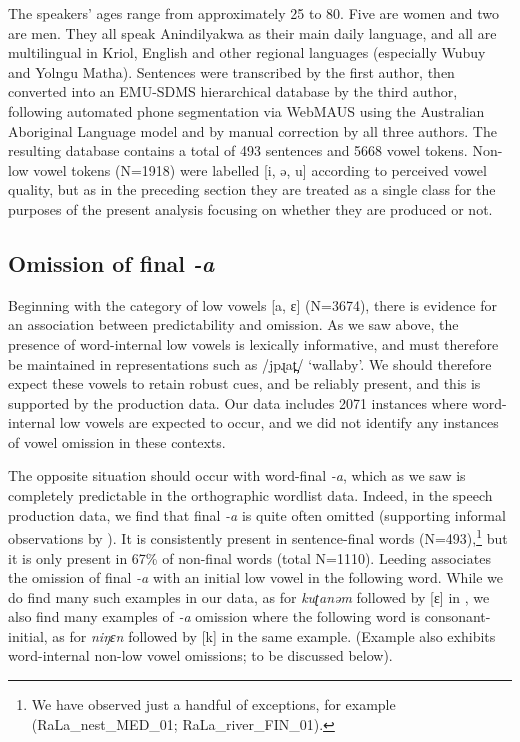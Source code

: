 \documentclass[output=paper,colorlinks,citecolor=brown]{langscibook}
\begin{document}
The speakers’ ages range from approximately 25 to 80. Five are women and two are men. They all speak Anindilyakwa as their main daily language, and all are multilingual in Kriol, English and other regional languages (especially Wubuy and Yolngu Matha). Sentences were transcribed by the first author, then converted into an \textsc{EMU-SDMS} hierarchical database \citep{Winkelmann2017} by the third author, following automated phone segmentation via WebMAUS \citep{kisler2017multilingual} using the Australian Aboriginal Language model and by manual correction by all three authors. The resulting database contains a total of 493 sentences and 5668 vowel tokens. Non-low vowel tokens (N=1918) were labelled [i, ə, u] according to perceived vowel quality, but as in the preceding section they are treated as a single class for the purposes of the present analysis focusing on whether they are produced or not.

\subsection{Omission of final \textit{{}-a}} \label{sec:mansfield:5.2}

Beginning with the category of low vowels [a, ɛ] (N=3674), there is evidence for an association between predictability and omission. As we saw above, the presence of word-internal low vowels is lexically informative, and must therefore be maintained in representations such as /jpɻat̪/ ‘wallaby’. We should therefore expect these vowels to retain robust cues, and be reliably present, and this is supported by the production data. Our data includes 2071 instances where word-internal low vowels are expected to occur, and we did not identify any instances of vowel omission in these contexts.

The opposite situation should occur with word-final \textit{{}-a}, which as we saw is completely predictable in the orthographic wordlist data. Indeed, in the speech production data, we find that final \textit{{}-a} is quite often omitted (supporting informal observations by \citealt[139]{Leeding1989}). It is consistently present in sentence{}-final words (N=493),\footnote{We have observed just a handful of exceptions, for example (RaLa\_nest\_MED\_01; RaLa\_river\_FIN\_01).} but it is only present in 67\% of non-final words (total N=1110). Leeding associates the omission of final \textit{{}-a} with an initial low vowel in the following word. While we do find many such examples in our data, as for \textit{kuʈanəm} followed by [ɛ] in , we also find many examples of \textit{{}-a} omission where the following word is consonant-initial, as for \textit{niŋɛn} followed by [k] in the same example. (Example  also exhibits word-internal non-low vowel omissions; to be discussed below). 
\end{document}
